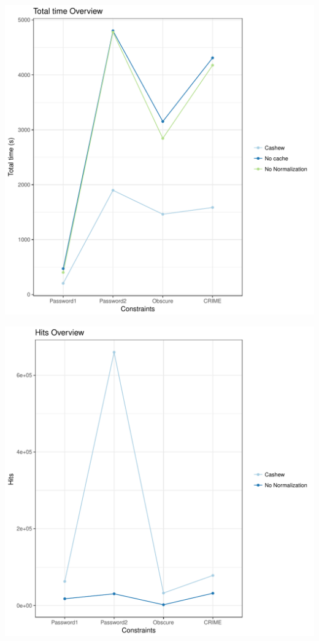 \documentclass{article}\usepackage[]{graphicx}\usepackage[]{color}
\makeatletter
\def\maxwidth{ %
  \ifdim\Gin@nat@width>\linewidth
    \linewidth
  \else
    \Gin@nat@width
  \fi
}
\newenvironment{knitrout}{}{} %
\makeatother
\begin{document}
\begin{knitrout}
\color{fgcolor}
\includegraphics[width=\maxwidth]{figure/overview_sumTime-1} 

\end{knitrout}
\begin{knitrout}
\color{fgcolor}
\includegraphics[width=\maxwidth]{figure/overview_hits-1} 

\end{knitrout}
\end{document}
